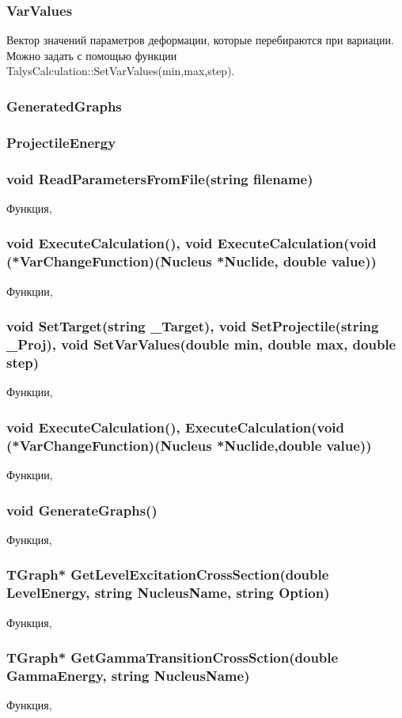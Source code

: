 \documentclass[a4paper,12pt]{extarticle}
\begin{document}
\subsubsection{VarValues}
Вектор значений параметров деформации, которые перебираются при вариации. Можно задать с помощью функции TalysCalculation::SetVarValues(min,max,step).
\subsubsection{GeneratedGraphs}

\subsubsection{ProjectileEnergy}

\subsubsection{void ReadParametersFromFile(string filename)}
Функция, 
\subsubsection{void ExecuteCalculation(), void ExecuteCalculation(void (*VarChangeFunction)(Nucleus *Nuclide, double value))}
Функции, 
\subsubsection{void SetTarget(string _Target), void SetProjectile(string _Proj), void SetVarValues(double min, double max, double step)}
Функции, 
\subsubsection{void ExecuteCalculation(), ExecuteCalculation(void (*VarChangeFunction)(Nucleus *Nuclide,double value))}
Функции, 
\subsubsection{void GenerateGraphs()}
Функция, 
\subsubsection{TGraph* GetLevelExcitationCrossSection(double LevelEnergy, string NucleusName, string Option)}
Функция, 
\subsubsection{TGraph* GetGammaTransitionCrossSction(double GammaEnergy, string NucleusName)}
Функция, 
\end{document}
